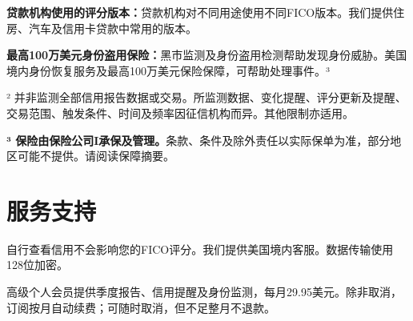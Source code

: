 \documentclass[UTF8,fontset=none,11pt,a4paper]{ctexart}
\begin{document}
\textbf{贷款机构使用的评分版本：}贷款机构对不同用途使用不同FICO版本。我们提供住房、汽车及信用卡贷款中常\allowbreak\mbox{用的版本。}


\textbf{最高100万美元身份盗用保险：}黑市监测及身份盗用检测帮助发现身份威胁。美国境内身份恢复服务及最高100万美元保险保障，可帮助处理事件。³


² 并非监测全部信用报告数据或交易。所监测数据、变化提醒、评分更新及提醒、交易范围、触发条件、时间及频率因征信机构而异。其他限\allowbreak\mbox{制亦适用。}


\textbf{³ 保险由保险公司I承保及管理。}条款、条件及除外责任以实际保单为准，部分地区可能不提供。请阅读\allowbreak\mbox{保障摘要。}


\section*{服务支持}
自行查看信用不会影响您的FICO评分。我们提供美国境内客服。数据传输使用128位加密。


高级个人会员提供季度报告、信用提醒及身份监测，每月29.95美元。除非取消，订阅按月自动续费；可随时取消，但不足整\allowbreak\mbox{月不退款。}
\end{document}
